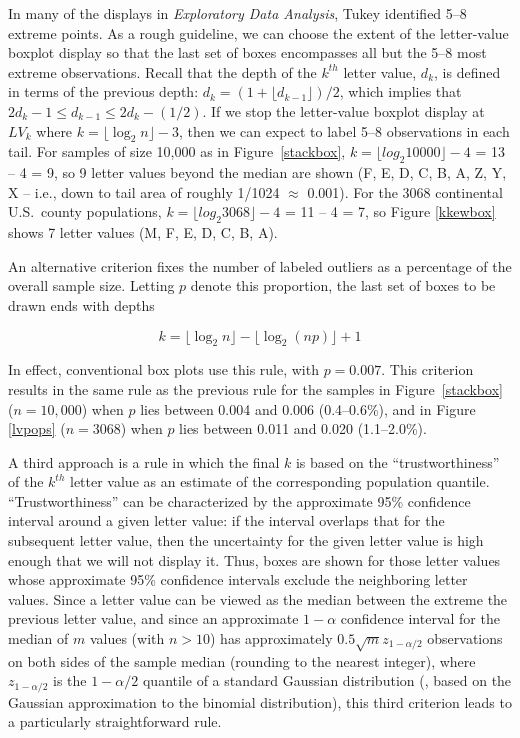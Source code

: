 \documentclass[oneside]{article}
\begin{document}
In many of the displays in \textit{Exploratory Data Analysis}, Tukey identified 5--8 extreme points. As a rough guideline, we can choose the extent of the letter-value boxplot display so that the last set of boxes encompasses all but the 5--8 most extreme observations. Recall that the depth of the $k^{th}$ letter value, $d_k$, is defined in terms of the previous depth: $d_k = (1 + \lfloor d_{k-1} \rfloor)/2$, which implies that $2 d_{k} -1 \leq d_{k-1} \leq 2 d_k - (1/2)$. If we stop the letter-value boxplot display at $LV_k$ where $k = \lfloor \log_2 n \rfloor - 3$, then we can expect to label 5--8 observations in each tail. For samples of size 10,000 as in Figure~\ref{stackbox}, $k = \lfloor log_2 10000 \rfloor - 4$ = 13 -- 4 = 9, so 9 letter values beyond the median are shown (F, E, D, C, B, A, Z, Y, X -- i.e., down to tail area of roughly 1/1024 $\approx$ 0.001). For the 3068 continental U.S.~county populations, $k = \lfloor log_2 3068 \rfloor - 4$ = 11 -- 4 = 7, so Figure \ref{kkewbox} shows 7 letter values (M, F, E, D, C, B, A).


An alternative criterion fixes the number of labeled outliers as a percentage of the overall sample size. Letting $p$ denote this proportion, the last set of boxes to be drawn ends with depths

\begin{equation}
k = \lfloor \log_2 n \rfloor - \lfloor \log_2 (np) \rfloor + 1
\end{equation}

\noindent In effect, conventional box plots use this rule, with $p = 0.007$. This criterion results in the same rule as the previous rule for the samples in Figure~\ref{stackbox} ($n = 10,000$) when $p$ lies between 0.004 and 0.006 (0.4--0.6\%), and in Figure \ref{lvpops} ($n = 3068$) when $p$ lies between 0.011 and 0.020 (1.1--2.0\%).

A third approach is a rule in which the final $k$ is based on the ``trustworthiness'' of the $k^{th}$ letter value as an estimate of the corresponding population quantile. ``Trustworthiness'' can be characterized by the approximate 95\% confidence interval around a given letter value: if the interval overlaps that for the subsequent letter value, then the uncertainty for the given letter value is high enough that we will not display it. Thus, boxes are shown for those letter values whose approximate 95\% confidence intervals exclude the neighboring letter values. Since a letter value can be viewed as the median between the extreme the previous letter value, and since an approximate $1-\alpha$ confidence interval for the median of $m$ values (with $n > 10$) has approximately $0.5 \sqrt{m} z_{1-\alpha/2}$ observations on both sides of the sample median (rounding to the nearest integer), where $z_{1-\alpha/2}$ is the ${1-\alpha/2}$ quantile of a standard Gaussian distribution (\citet[161]{ha.order}, based on the Gaussian approximation to the binomial distribution), this third criterion leads to a particularly straightforward rule.
\end{document}
